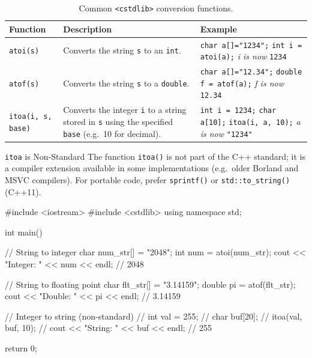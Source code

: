 \begin{table}[htbp]
\centering
\caption{Common \texttt{<cstdlib>} conversion functions.}
\label{tab:stdlib-funcs}
\renewcommand{\arraystretch}{1.4}
\begin{tabular}{@{} l p{4.5cm} p{5.8cm} @{}}
\toprule
\textbf{Function} & \textbf{Description} & \textbf{Example} \\
\midrule
\texttt{atoi(s)} &
    Converts the string \texttt{s} to an \texttt{int}. &
    \texttt{char a[]="1234";}\newline
    \texttt{int i = atoi(a);}\newline
    \textit{i is now} \texttt{1234} \\
\addlinespace
\texttt{atof(s)} &
    Converts the string \texttt{s} to a \texttt{double}. &
    \texttt{char a[]="12.34";}\newline
    \texttt{double f = atof(a);}\newline
    \textit{f is now} \texttt{12.34} \\
\addlinespace
\texttt{itoa(i, s, base)} &
    Converts the integer \texttt{i} to a string stored in \texttt{s}
    using the specified \texttt{base} (e.g.\ 10 for decimal). &
    \texttt{int i = 1234;}\newline
    \texttt{char a[10];}\newline
    \texttt{itoa(i, a, 10);}\newline
    \textit{a is now} \texttt{"1234"} \\
\bottomrule
\end{tabular}
\end{table}

\begin{warningbox}{\texttt{itoa} is Non-Standard}
The function \texttt{itoa()} is not part of the C++ standard; it is a
compiler extension available in some implementations (e.g.\ older
Borland and MSVC compilers).  For portable code, prefer
\texttt{sprintf()} or \texttt{std::to\_string()} (C++11).
\end{warningbox}

\begin{cppcode}
#include <iostream>
#include <cstdlib>
using namespace std;

int main() {
    // String to integer
    char num_str[] = "2048";
    int num = atoi(num_str);
    cout << "Integer: " << num << endl;        // 2048

    // String to floating point
    char flt_str[] = "3.14159";
    double pi = atof(flt_str);
    cout << "Double:  " << pi << endl;         // 3.14159

    // Integer to string (non-standard)
    // int val = 255;
    // char buf[20];
    // itoa(val, buf, 10);
    // cout << "String:  " << buf << endl;     // 255

    return 0;
}
\end{cppcode}

